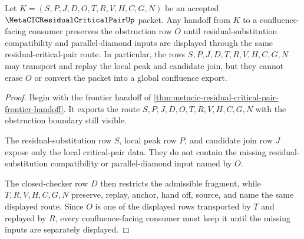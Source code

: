 \begin{theorem}
\label{thm:metacic-residual-critical-pair-obstruction-preservation}
Let $K=(S,P,J,D,O,T,R,V,H,C,G,N)$ be an accepted $\MetaCICResidualCriticalPairUp$ packet. Any handoff from $K$ to a confluence-facing consumer preserves the obstruction row $O$ until residual-substitution compatibility and parallel-diamond inputs are displayed through the same residual-critical-pair route. In particular, the rows $S,P,J,D,T,R,V,H,C,G,N$ may transport and replay the local peak and candidate join, but they cannot erase $O$ or convert the packet into a global confluence export.
\end{theorem}
\begin{proof}
Begin with the frontier handoff of \autoref{thm:metacic-residual-critical-pair-frontier-handoff}. It exports the route $S,P,J,D,O,T,R,V,H,C,G,N$ with the obstruction boundary still visible.

The residual-substitution row $S$, local peak row $P$, and candidate join row $J$ expose only the local critical-pair data. They do not contain the missing residual-substitution compatibility or parallel-diamond input named by $O$.

The closed-checker row $D$ then restricts the admissible fragment, while $T,R,V,H,C,G,N$ preserve, replay, anchor, hand off, source, and name the same displayed route. Since $O$ is one of the displayed rows transported by $T$ and replayed by $R$, every confluence-facing consumer must keep it until the missing inputs are separately displayed.
\end{proof}


